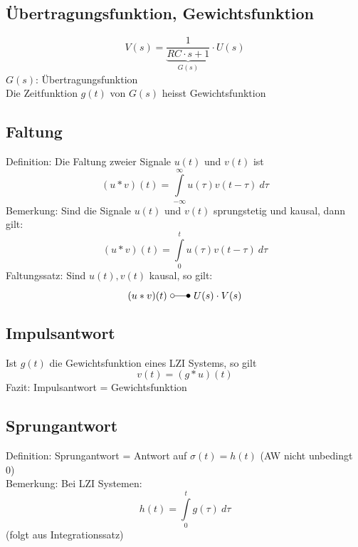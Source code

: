 \subsection{Übertragungsfunktion, Gewichtsfunktion}
\[ 
    V(s) = \underbrace{\frac{1}{RC \cdot s + 1}}_{G(s)} \cdot U(s) 
\]
$G(s)$: Übertragungsfunktion\\
Die Zeitfunktion $g(t)$ von $G(s)$ heisst Gewichtsfunktion\\

\subsection{Faltung}
Definition: Die Faltung zweier Signale $u(t)$ und $v(t)$ ist
\[ 
    (u * v)(t) = \int\limits_{-\infty}^{\infty} u(\tau) v(t - \tau) ~ d \tau 
\]
Bemerkung: Sind die Signale $u(t)$ und $v(t)$ sprungstetig und kausal, dann
gilt:
\[ 
    (u * v)(t) = \int\limits_{0}^{t} u(\tau) v(t - \tau) ~ d \tau 
\]
Faltungssatz:
Sind $u(t), v(t)$ kausal, so gilt:
\[ 
    (u * v) (t) ~ \laplace ~ U(s) \cdot V(s) 
\]

\subsection{Impulsantwort}
Ist $g(t)$ die Gewichtsfunktion eines LZI Systems, so gilt
\[ 
    v(t) = (g * u)(t) 
\]
Fazit: Impulsantwort = Gewichtsfunktion

\subsection{Sprungantwort}
Definition: Sprungantwort = Antwort auf $\sigma(t) = h(t)$
(AW nicht unbedingt 0) \\
Bemerkung: Bei LZI Systemen:
\[ 
    h(t) = \int\limits_{0}^{t} g(\tau) ~d \tau 
\]
(folgt aus Integrationssatz)
